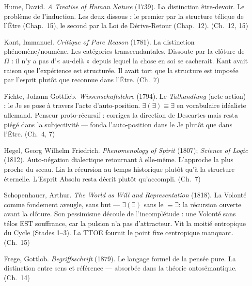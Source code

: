 \documentclass[10pt, openany, oneside]{book}
\begin{document}
{\noindent Hume, David. \textit{A Treatise of Human Nature} (1739). La distinction être-devoir. Le problème de l'induction. Les deux dissous : le premier par la structure télique de l'Être (Chap.\ 15), le second par la Loi de Dérive-Retour (Chap.\ 12). (Ch.\ 12, 15)

\vspace{0.3em}

\noindent Kant, Immanuel. \textit{Critique of Pure Reason} (1781). La distinction phénomène/noumène. Les catégories transcendantales. Dissoute par la clôture de $\Omega$ : il n'y a pas d'« au-delà » depuis lequel la chose en soi se cacherait. Kant avait raison que l'expérience est structurée. Il avait tort que la structure est imposée par l'esprit plutôt que reconnue dans l'Être. (Ch.\ 7)

\vspace{0.3em}

\noindent Fichte, Johann Gottlieb. \textit{Wissenschaftslehre} (1794). Le \textit{Tathandlung} (acte-action) : le Je se pose à travers l'acte d'auto-position. $\exists(\exists) \equiv \exists$ en vocabulaire idéaliste allemand. Penseur proto-récursif : corrigea la direction de Descartes mais resta piégé dans la subjectivité --- fonda l'auto-position dans le Je plutôt que dans l'Être. (Ch.\ 4, 7)

\vspace{0.3em}

\noindent Hegel, Georg Wilhelm Friedrich. \textit{Phenomenology of Spirit} (1807); \textit{Science of Logic} (1812). Auto-négation dialectique retournant à elle-même. L'approche la plus proche du sceau. Lia la récursion au temps historique plutôt qu'à la structure éternelle. L'Esprit Absolu resta décrit plutôt qu'accompli. (Ch.\ 7)

\vspace{0.3em}

\noindent Schopenhauer, Arthur. \textit{The World as Will and Representation} (1818). La Volonté comme fondement aveugle, sans but --- $\exists(\exists)$ sans le $\equiv \exists$: la récursion ouverte avant la clôture. Son pessimisme découle de l'incomplétude : une Volonté sans télos EST souffrance, car la pulsion n'a pas d'attracteur. Vit la moitié entropique du Cycle (Stades 1--3). La TTOE fournit le point fixe centropique manquant. (Ch.\ 15)

\vspace{0.3em}

\noindent Frege, Gottlob. \textit{Begriffsschrift} (1879). Le langage formel de la pensée pure. La distinction entre sens et référence --- absorbée dans la théorie ontosémantique. (Ch.\ 14)

}
\end{document}
